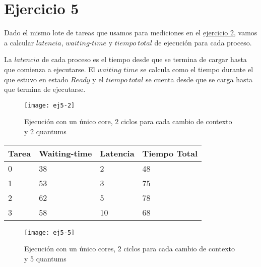 \section{Ejercicio 5}

Dado el mismo lote de tareas que usamos para mediciones en el \hyperref[sec:ej2]{ejercicio 2}, vamos a calcular $latencia$, $waiting$-$time$ y $tiempo\ total$ de ejecución para cada proceso.

La $latencia$ de cada proceso es el tiempo desde que se termina de cargar hasta que comienza a ejecutarse.
El $waiting$ $time$ se calcula como el tiempo durante el que estuvo en estado $Ready$
y el $tiempo\ total$ se cuenta desde que se carga hasta que termina de ejecutarse.
\\

\begin{center}
\end{center}

\begin{figure}[H]
		\centering
		\texttt{[image: ej5-2]}
		\caption{Ejecución con un único core, 2 ciclos para cada cambio de contexto y 2 quantums}
		\label{fig:ej5.2}
\end{figure}

\begin{center}
		\begin{tabular}{| l | l | l | l |}
				\hline
				Tarea & Waiting-time & Latencia & Tiempo Total	\\ \hline
				0 &	38	 &	2	 &	48	\\
				1 &	53	 &	3	 &	75	\\
				2 &	62	 &	5	 &	78	\\
				3 &	58	 &	10 &	68	\\
				\hline
		\end{tabular}
\end{center}

\begin{figure}[H]
		\centering
		\texttt{[image: ej5-5]}
		\caption{Ejecución con un único cores, 2 ciclos para cada cambio de contexto y 5 quantums}
		\label{fig:ej5-5}
\end{figure}

